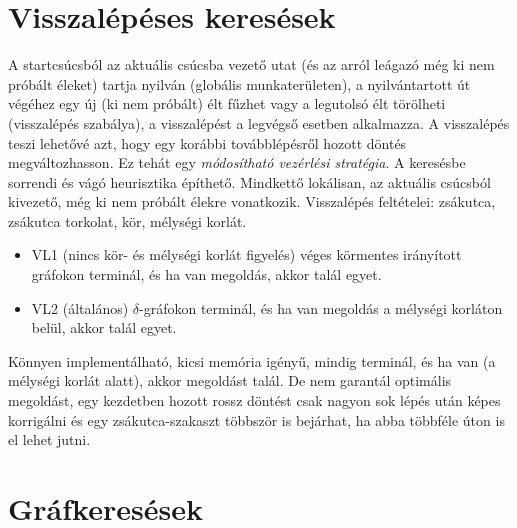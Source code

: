 \documentclass[margin=0px]{article}
\begin{document}
\section{Visszalépéses keresések}

A startcsúcsból az aktuális csúcsba vezető utat (és az arról leágazó még ki nem próbált éleket) tartja nyilván (globális munkaterületen), a nyilvántartott út végéhez egy új (ki nem próbált) élt fűzhet vagy a legutolsó élt törölheti (visszalépés szabálya), a visszalépést a legvégső esetben alkalmazza. A visszalépés teszi lehetővé azt, hogy egy korábbi továbblépésről hozott döntés megváltozhasson. Ez tehát egy \textit{módosítható vezérlési stratégia}. A keresésbe sorrendi és vágó heurisztika építhető. Mindkettő lokálisan, az aktuális csúcsból kivezető, még ki nem próbált élekre vonatkozik.
Visszalépés feltételei: zsákutca, zsákutca torkolat, kör, mélységi korlát.
\begin{itemize}
    \item VL1 (nincs kör- és mélységi korlát figyelés) véges körmentes irányított gráfokon terminál, és ha van megoldás, akkor talál egyet.
    \item VL2 (általános) $\delta$-gráfokon terminál, és ha van megoldás a mélységi korláton belül, akkor talál egyet.
\end{itemize}
Könnyen implementálható, kicsi memória igényű, mindig terminál, és ha van (a mélységi korlát alatt), akkor megoldást talál. De nem garantál optimális megoldást, egy kezdetben hozott rossz döntést csak nagyon sok lépés után képes korrigálni és egy zsákutca-szakaszt többször is bejárhat, ha abba többféle úton is el lehet jutni.

\section{Gráfkeresések}
\end{document}

